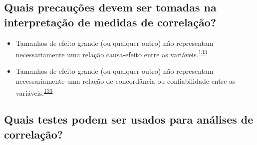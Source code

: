 \documentclass[
  a4paper,
]{book}
\begin{document}
\hypertarget{quais-precauuxe7uxf5es-devem-ser-tomadas-na-interpretauxe7uxe3o-de-medidas-de-correlauxe7uxe3o}{%
\subsection{Quais precauções devem ser tomadas na interpretação de medidas de correlação?}\label{quais-precauuxe7uxf5es-devem-ser-tomadas-na-interpretauxe7uxe3o-de-medidas-de-correlauxe7uxe3o}}

\begin{itemize}
\item
  Tamanhos de efeito grande (ou qualquer outro) não representam necessariamente uma relação causa-efeito entre as variáveis.\textsuperscript{\protect\hyperlink{ref-khamis2008}{133}}
\item
  Tamanhos de efeito grande (ou qualquer outro) não representam necessariamente uma relação de concordância ou confiabilidade entre as variáveis.\textsuperscript{\protect\hyperlink{ref-khamis2008}{133}}
\end{itemize}

\hypertarget{quais-testes-podem-ser-usados-para-anuxe1lises-de-correlauxe7uxe3o}{%
\subsection{Quais testes podem ser usados para análises de correlação?}\label{quais-testes-podem-ser-usados-para-anuxe1lises-de-correlauxe7uxe3o}}
\end{document}
